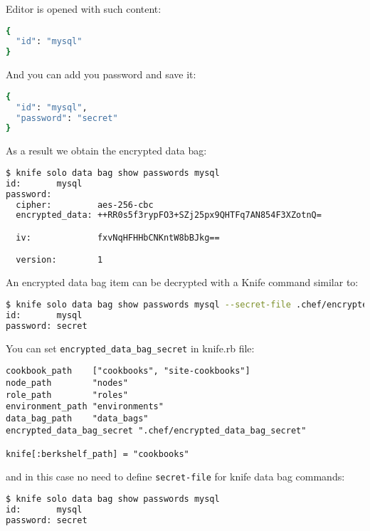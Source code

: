 Editor is opened with such content:

\begin{lstlisting}[language=Bash,label=lst:my-cloud-chef-databag20]
{
  "id": "mysql"
}
\end{lstlisting}

And you can add you password and save it:

\begin{lstlisting}[language=Bash,label=lst:my-cloud-chef-databag21]
{
  "id": "mysql",
  "password": "secret"
}
\end{lstlisting}

As a result we obtain the encrypted data bag:

\begin{lstlisting}[language=Bash,label=lst:my-cloud-chef-databag7]
$ knife solo data bag show passwords mysql
id:       mysql
password:
  cipher:         aes-256-cbc
  encrypted_data: ++RR0s5f3rypFO3+SZj25px9QHTFq7AN854F3XZotnQ=

  iv:             fxvNqHFHHbCNKntW8bBJkg==

  version:        1
\end{lstlisting}

An encrypted data bag item can be decrypted with a Knife command similar to:

\begin{lstlisting}[language=Bash,label=lst:my-cloud-chef-databag8,title=my-cloud/Gemfile]
$ knife solo data bag show passwords mysql --secret-file .chef/encrypted_data_bag_secret
id:       mysql
password: secret
\end{lstlisting}

You can set \lstinline!encrypted_data_bag_secret! in knife.rb file:

\begin{lstlisting}[label=lst:my-cloud-chef-databag9,title=my-cloud/.chef/knife.rb]
cookbook_path    ["cookbooks", "site-cookbooks"]
node_path        "nodes"
role_path        "roles"
environment_path "environments"
data_bag_path    "data_bags"
encrypted_data_bag_secret ".chef/encrypted_data_bag_secret"

knife[:berkshelf_path] = "cookbooks"
\end{lstlisting}

and in this case no need to define \lstinline!secret-file! for knife data bag commands:

\begin{lstlisting}[language=Bash,label=lst:my-cloud-chef-databag11]
$ knife solo data bag show passwords mysql
id:       mysql
password: secret
\end{lstlisting}


